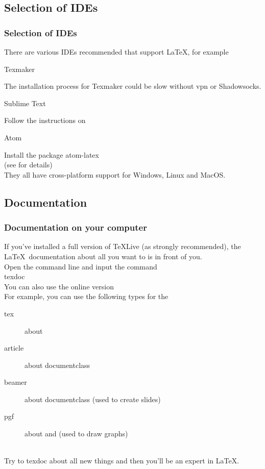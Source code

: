 \subsection{Selection of IDEs}

\begin{frame}
	\frametitle{Selection of IDEs}
	\small
	There are various IDEs recommended that support \LaTeX , for example
	\begin{block}{Texmaker}
	\end{block}
	The installation process for Texmaker could be slow without vpn or Shadowsocks. 
	\begin{block}{Sublime Text}
		 \\[0.5em]
	\end{block}
	Follow the instructions on 
	\begin{block}{Atom}
		 \\[0.5em]
	\end{block}
	Install the package \alert{atom-latex} 
	\\(see  for details)
	\\They all have cross-platform support for Windows, Linux and MacOS.
\end{frame}

\subsection{Documentation}

\begin{frame}
	\frametitle{Documentation on your computer}
	If you've installed a full version of TeXLive (as strongly recommended), the \LaTeX\ documentation about all you want to is in front of you.\\[0.5em]
	Open the command line and input the command\\
	\alert{texdoc} \\[0.5em]
	You can also use the online version \\[0.5em]
	For example, you can use the following types for the 
	\begin{description}
		\item[tex] 		about \\
		\item[article] 	about documentclass \\
		\item[beamer] 	about documentclass  (used to create slides)\\
		\item[pgf]		about  and  (used to draw graphs)\\
	\end{description}
	\ \\[-0.5em]
	Try to \alert{texdoc} about all new things and then you'll be an expert in \LaTeX.
\end{frame}

